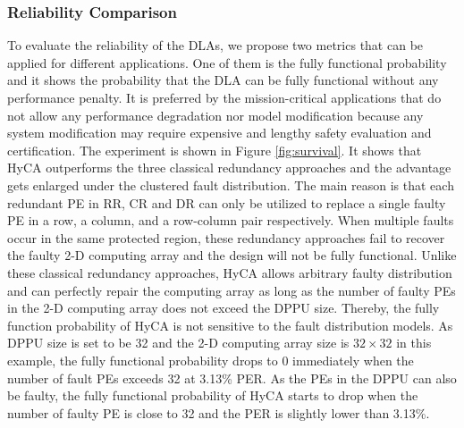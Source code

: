 \subsubsection{Reliability Comparison}
To evaluate the reliability of the DLAs, we propose two metrics that can be applied for different applications. One of them is the fully functional probability and it shows the probability that the DLA can be fully functional without any performance penalty. It is preferred by the mission-critical applications that do not allow any performance degradation nor model modification because any system modification may require expensive and lengthy safety evaluation and certification. The experiment is shown in Figure \ref{fig:survival}. It shows that HyCA outperforms the three classical redundancy approaches and the advantage gets enlarged under the clustered fault distribution. The main reason is that each redundant PE in RR, CR and DR can only be utilized to replace a single faulty PE in a row, a column, and a row-column pair respectively. When multiple faults occur in the same protected region, these redundancy approaches fail to recover the faulty 2-D computing array and the design will not be fully functional. Unlike these classical redundancy approaches, HyCA allows arbitrary faulty distribution and can perfectly repair the computing array as long as the number of faulty PEs in the 2-D computing array does not exceed the DPPU size. Thereby, the fully function probability of HyCA is not sensitive to the fault distribution models. As DPPU size is set to be 32 and the 2-D computing array size is $32 \times 32$ in this example, the fully functional probability drops to 0 immediately when the number of fault PEs exceeds 32 at 3.13\% PER. As the PEs in the DPPU can also be faulty, the fully functional probability of HyCA starts to drop when the number of faulty PE is close to 32 and the PER is slightly lower than 3.13\%.

